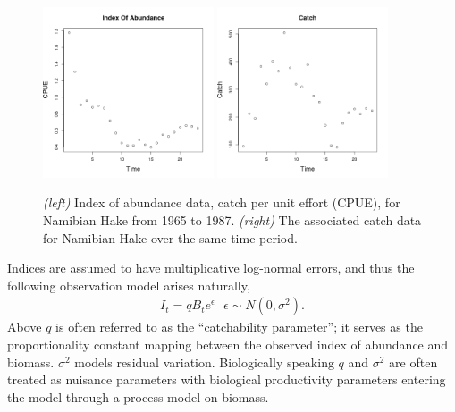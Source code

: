 \documentclass[12pt]{ucscthesis}
\begin{document}
\begin{figure}[h!]
        \includegraphics[width=0.45\textwidth]{./plots/hakeIndex.png}
        \includegraphics[width=0.45\textwidth]{./plots/hakeCatch.png}
        \caption{\label{hakeData}
        \textit{(left)} Index of abundance data, catch per unit effort (CPUE), for Namibian Hake from 1965 to 1987. %
        \textit{(right)} The associated catch data for Namibian Hake over the same time period.
        }
\end{figure}

Indices are assumed to have multiplicative log-normal errors, and thus
the following observation model arises naturally,
\begin{align}
I_t = q B_t e^\epsilon ~~~ \epsilon\sim N(0, \sigma^2). \label{resp}
\end{align}
%
Above $q$ is often referred to as the ``catchability parameter''; it serves as the %
proportionality constant mapping between the observed index of abundance and biomass.
$\sigma^2$ models residual variation. Biologically speaking $q$ and $\sigma^2$
are often treated as nuisance parameters with biological productivity parameters
entering the model through a process model on biomass.
\end{document}
